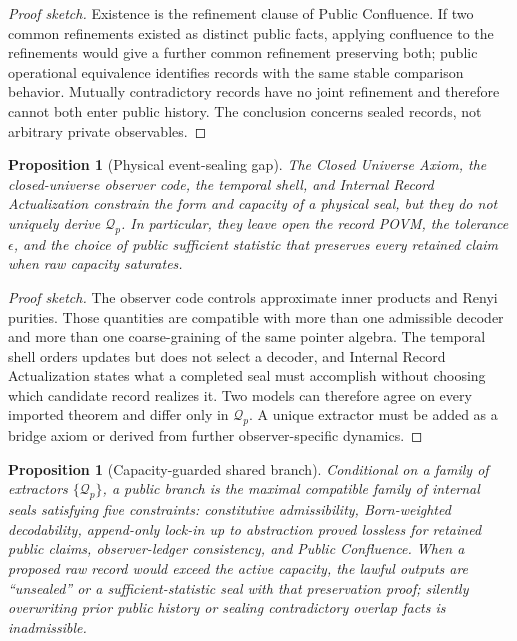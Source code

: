 \documentclass[11pt]{article}
\theoremstyle{plain}
\newtheorem{proposition}[theorem]{Proposition}
\theoremstyle{definition}
\theoremstyle{remark}
\newenvironment{proofsketch}{\begin{proof}[Proof sketch]}{\end{proof}}
\begin{document}
\begin{proofsketch}
Existence is the refinement clause of Public Confluence. If two common refinements existed as distinct public facts, applying confluence to the refinements would give a further common refinement preserving both; public operational equivalence identifies records with the same stable comparison behavior. Mutually contradictory records have no joint refinement and therefore cannot both enter public history. The conclusion concerns sealed records, not arbitrary private observables.
\end{proofsketch}

\begin{proposition}[Physical event-sealing gap]
The Closed Universe Axiom, the closed-universe observer code, the temporal shell, and Internal Record Actualization constrain the form and capacity of a physical seal, but they do not uniquely derive \(\mathcal{Q}_p\). In particular, they leave open the record POVM, the tolerance \(\epsilon\), and the choice of public sufficient statistic that preserves every retained claim when raw capacity saturates.
\end{proposition}

\begin{proofsketch}
The observer code controls approximate inner products and Renyi purities. Those quantities are compatible with more than one admissible decoder and more than one coarse-graining of the same pointer algebra. The temporal shell orders updates but does not select a decoder, and Internal Record Actualization states what a completed seal must accomplish without choosing which candidate record realizes it. Two models can therefore agree on every imported theorem and differ only in \(\mathcal{Q}_p\). A unique extractor must be added as a bridge axiom or derived from further observer-specific dynamics.
\end{proofsketch}

\begin{proposition}[Capacity-guarded shared branch]
Conditional on a family of extractors \(\{\mathcal{Q}_p\}\), a public branch is the maximal compatible family of internal seals satisfying five constraints: constitutive admissibility, Born-weighted decodability, append-only lock-in up to abstraction proved lossless for retained public claims, observer-ledger consistency, and Public Confluence. When a proposed raw record would exceed the active capacity, the lawful outputs are ``unsealed'' or a sufficient-statistic seal with that preservation proof; silently overwriting prior public history or sealing contradictory overlap facts is inadmissible.
\end{proposition}
\end{document}
